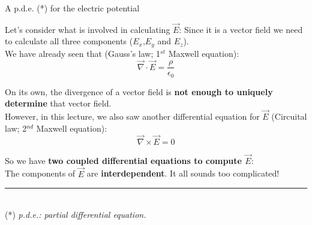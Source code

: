 \begin{frame}{A p.d.e. (*) for the electric potential}

Let's consider what is involved in calculating $\vec{E}$:
Since it is a vector field we need to calculate all three components
($E_x$,$E_y$ and $E_z$).\\

\vspace{0.2cm}
We have already seen that (Gauss's law; 1$^{st}$ Maxwell equation):
\begin{equation*}
  \vec{\nabla} \cdot \vec{E} = \frac{\rho}{\epsilon_0}
\end{equation*}

On its own, the divergence of a vector field is
{\bf not enough to uniquely determine} that vector field.\\
However, in this lecture, we also saw another differential equation for
$\vec{E}$ (Circuital law; 2$^{nd}$ Maxwell equation):
\begin{equation*}
  \vec{\nabla} \times \vec{E} = 0
\end{equation*}

So we have {\bf two coupled differential equations to compute $\vec{E}$}:\\
The components of $\vec{E}$ are {\bf interdependent}.
It all sounds too complicated!

\vspace{0.2cm}

\noindent\rule{2cm}{0.4pt}\\
{\scriptsize
 (*) {\it p.d.e.: partial differential equation.}
}

\end{frame}

%
%
%


